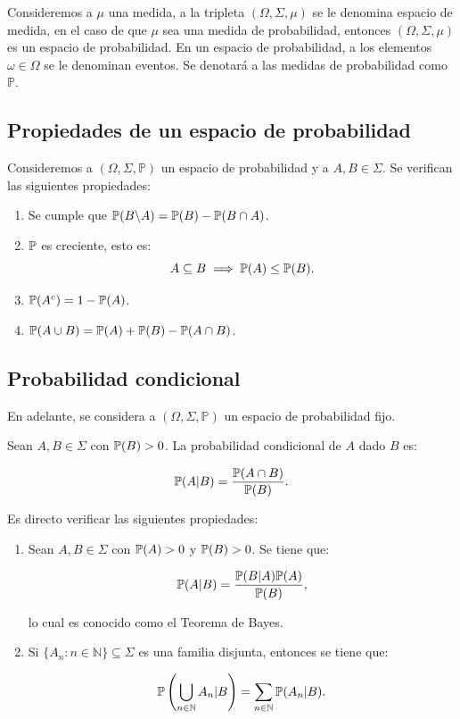 Consideremos a $\mu$ una medida, a la tripleta $(\Omega, \Sigma, \mu)$ se le denomina espacio de medida, en el caso de que $\mu$ sea una medida de probabilidad, entonces $(\Omega, \Sigma, \mu)$ es un espacio de probabilidad. En un espacio de probabilidad, a los elementos $\omega\in\Omega$ se le denominan eventos. Se denotará a las medidas de probabilidad como $\mathbb{P}$.  

\subsection{Propiedades de un espacio de probabilidad}

Consideremos a $(\Omega, \Sigma, \mathbb{P})$ un espacio de probabilidad y a $A,B\in\Sigma$. Se verifican las siguientes propiedades:

\begin{enumerate}
    \item Se cumple que $\mathbb{P} (B\backslash A)=\mathbb{P} (B)-\mathbb{P} (B\cap A)$.
    \item $\mathbb{P}$ es creciente, esto es:
    \[A\subseteq B \implies \mathbb{P} (A)\leq \mathbb{P} (B).\]
    \item $\mathbb{P} (A^c)=1-\mathbb{P}(A)$.
    \item $\mathbb{P}(A\cup B)=\mathbb{P}(A)+\mathbb{P}(B)-\mathbb{P}(A\cap B)$.
\end{enumerate}

\subsection{Probabilidad condicional}

En adelante, se considera a $(\Omega, \Sigma, \mathbb{P})$ un espacio de probabilidad fijo.

\begin{definition}
Sean $A,B\in\Sigma$ con $\mathbb{P} (B)>0$. La probabilidad condicional de $A$ dado $B$ es:

\[\mathbb{P} (A|B)=\dfrac{\mathbb{P} (A\cap B)}{\mathbb{P}(B)}.\]
\end{definition}

Es directo verificar las siguientes propiedades:

\begin{enumerate}
    \item Sean $A,B\in\Sigma$ con $\mathbb{P} (A)>0$ y $\mathbb{P} (B)>0$. Se tiene que:

\[\mathbb{P}(A|B)=\dfrac{\mathbb{P}(B|A)\mathbb{P}(A)}{\mathbb{P}(B)},\]

lo cual es conocido como el Teorema de Bayes.


\item Si $\{A_n:n\in\mathbb{N}\}\subseteq \Sigma$ es una familia disjunta, entonces se tiene que:

\[\mathbb{P}\left(\bigcup\limits_{n\in\mathbb{N}}A_n|B\right)=\sum\limits_{n\in\mathbb{N}}\mathbb{P}(A_n|B).\]
\end{enumerate}

